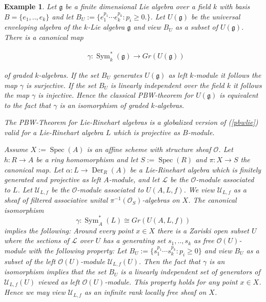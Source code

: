 \documentclass{amsart}
\theoremstyle{plain}
\newtheorem{example}[theorem]{Example}
\theoremstyle{definition}
\theoremstyle{remark}
\numberwithin{equation}{theorem}
\begin{document}
\begin{example} 

Let ${\mathfrak{g}}$ be a finite dimensional Lie algebra over a field $k$ with basis $B=\{e_1,..,e_k\}$ and let
$B_U:=\{ e_1^{p_1}\cdots e_k^{p_k}: p_i\geq 0.\}$. Let $U({\mathfrak{g}})$ be the universal enveloping algebra of the $k$-Lie algebra ${\mathfrak{g}}$
and view $B_U$ as a subset of $U({\mathfrak{g}})$.
There is a canonical map

\begin{align}
&\label{pbwlie} \gamma: {\operatorname{Sym} }^*_k({\mathfrak{g}}) \rightarrow  Gr(U({\mathfrak{g}})) 
\end{align}

of graded $k$-algebras. If the set $B_U$ generates $U({\mathfrak{g}})$ as left $k$-module it follows the map $\gamma$ is surjective.
If the set $B_U$ is linearly independent over the field $k$ it follows the map $\gamma$ is injective. Hence
the classical PBW-theorem for $U({\mathfrak{g}})$ is equivalent to the fact that $\gamma$ is an isomorphism of graded $k$-algebras.

The PBW-Theorem for Lie-Rinehart algebras is a globalized version of (\ref{pbwlie})
valid for a Lie-Rinehart algebra $L$ which is projective as
$B$-module. 

Assume $X:={\operatorname{Spec} }({A})$ is an affine scheme with structure sheaf ${\mathcal{O} }$. Let $h:{R}\rightarrow {A}$ 
be a ring homomorphism and let $S:={\operatorname{Spec} }({R})$ and $\pi:X\rightarrow S$ the canonical map.
Let $\alpha:L\rightarrow {\operatorname{Der} }_{R}({A})$ be a Lie-Rinehart algebra which is finitely generated and projective as left ${A}$-module, 
and let $\mathcal{L}$ be the ${\mathcal{O} }$-module associated to $L$. Let $\mathcal{U}_{L,f}$ be the ${\mathcal{O} }$-module associated to $U({A},L,f)$.
We view $\mathcal{U}_{L,f}$ as a sheaf of filtered associative unital $\pi^{-1}({\mathcal{O} }_S)$-algebras on $X$.
The canonical isomorphism
\[ \gamma: {\operatorname{Sym} }_{A}^*(L) \cong Gr(U({A},L,f)) \]
implies the following: Around every point $x\in X$ there is a Zariski open subset $U$
where the sections of $\mathcal{L}$ over $U$ has a generating
set $s_1,..,s_k$ as free ${\mathcal{O} }(U)$-module with the following property: Let
$B_U:=\{s_1^{p_1}\cdots s_k^{p_k}:p_i\geq 0\}$ and view $B_U$ as a subset of the left ${\mathcal{O} }(U)$-module $\mathcal{U}_{L,f}(U)$.
Then the fact that $\gamma$ is an isomorphism implies that
the set $B_U$ is a linearly independent set of generators of $\mathcal{U}_{L,f}(U)$
viewed as left ${\mathcal{O} }(U)$-module. This property holds for any point $x\in X$. Hence we may view $\mathcal{U}_{L,f}$ as an infinite
rank locally free sheaf on $X$.
\end{example}
\end{document}
